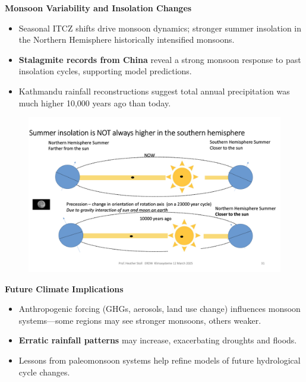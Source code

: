 \documentclass[fontsize=8pt, a4paper, landscape, fleqn]{scrartcl}
\renewcommand{\subsection}[1]{%
    \noindent\colorbox{subsectioncolor}{%
        \parbox{\dimexpr\columnwidth-2\fboxsep}{\color{white}\textbf{#1}}}%
    \vspace{0.5mm}%
}
\begin{document}
\begin{multicols*}{3}[\raggedcolumns]
\subsection{Monsoon Variability and Insolation Changes}
\begin{itemize}
\item Seasonal ITCZ shifts drive monsoon dynamics; stronger summer insolation in the Northern Hemisphere historically intensified monsoons.
\item \textbf{Stalagmite records from China} reveal a strong monsoon response to past insolation cycles, supporting model predictions.
\item Kathmandu rainfall reconstructions suggest total annual precipitation was much higher 10,000 years ago than today.
\end{itemize}

\begin{figure}[H]
    \centering
    \includegraphics[width=1\linewidth]{CS//img/Summer_insolation.png}
\end{figure}
\subsection{Future Climate Implications}
\begin{itemize}
\item Anthropogenic forcing (GHGs, aerosols, land use change) influences monsoon systems—some regions may see stronger monsoons, others weaker.
\item \textbf{Erratic rainfall patterns} may increase, exacerbating droughts and floods.
\item Lessons from paleomonsoon systems help refine models of future hydrological cycle changes.
\end{itemize}



\end{multicols*}
\end{document}
